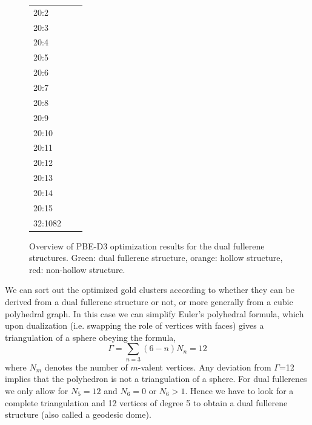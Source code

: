 \begin{figure}[p]
\begin{tabular}{lp{3cm}|p{3cm}}
		20:2    & \cellcolor{mygreen}         & \cellcolor{mygreen}       \\
		20:3    & \cellcolor{myorange}        & \cellcolor{myorange}      \\
		20:4    & \cellcolor{mygreen}         & \cellcolor{mygreen}       \\
		20:5    & \cellcolor{mygreen}         & \cellcolor{mygreen}       \\
		20:6    & \cellcolor{myorange}        & \cellcolor{myorange}      \\
		20:7    & \cellcolor{myorange}        & \cellcolor{mygreen}       \\
		20:8    & \cellcolor{myorange}        & \cellcolor{myorange}      \\
		20:9    & \cellcolor{myorange}        & \cellcolor{myorange}      \\
		20:10   & \cellcolor{myorange}        & \cellcolor{myorange}      \\
		20:11   & \cellcolor{myorange}        & \cellcolor{myorange}      \\
		20:12   & \cellcolor{red}             & \cellcolor{red}           \\
		20:13   & \cellcolor{myorange}        & \cellcolor{myorange}      \\
		20:14   & \cellcolor{mygreen}         & \cellcolor{red}           \\
		20:15   & \cellcolor{myorange}        & \cellcolor{mygreen}       \\
		32:1082 & \cellcolor{mygreen}         & \cellcolor{mygreen}       \\ \bottomrule
	\end{tabular}
	\caption{Overview of PBE-D3 optimization results for the dual fullerene structures. 
	Green: dual fullerene structure, orange: hollow structure, red: non-hollow structure.}
	\label{fig:optOverview}
\end{figure}

We can sort out the optimized gold clusters according to whether they can be
derived from a dual fullerene structure or not, or more generally from a cubic
polyhedral graph. In this case we can simplify Euler's polyhedral formula,
which upon dualization (i.e. swapping the role of vertices with faces) gives a
triangulation of a sphere obeying the formula,
%
\begin{equation}
\label{eq3valent} 
\Gamma=\sum_{n=3}(6-n)N_n = 12
\end{equation}
%
where $N_m$ denotes the number of $m$-valent vertices. Any deviation from
$\Gamma$=12 implies that the polyhedron is not a triangulation of a sphere. For
dual fullerenes we only allow for $N_5=12$ and $N_6=0$ or $N_6>1$. Hence we
have to look for a complete triangulation and 12 vertices of degree 5 to obtain
a dual fullerene structure (also called a geodesic dome).


